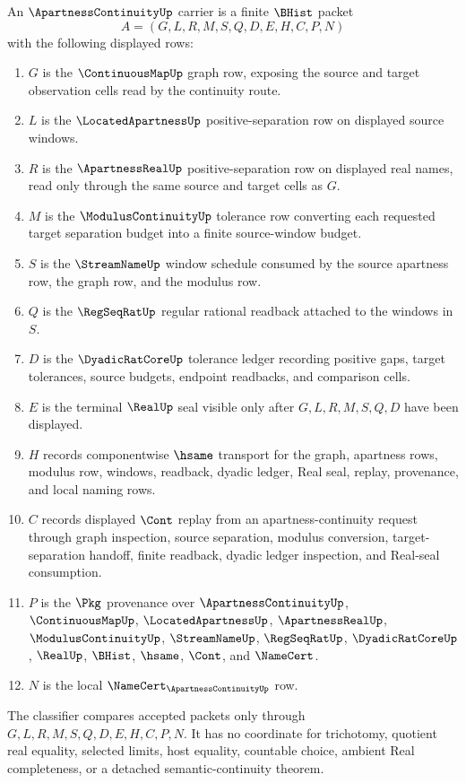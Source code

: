 \begin{definition}
\label{def:apartness-continuity-carrier}
An $\ApartnessContinuityUp$ carrier is a finite $\BHist$ packet
$$
A=(G,L,R,M,S,Q,D,E,H,C,P,N)
$$
with the following displayed rows:
\begin{enumerate}
\item $G$ is the $\ContinuousMapUp$ graph row, exposing the source and target observation cells read by the continuity route.
\item $L$ is the $\LocatedApartnessUp$ positive-separation row on displayed source windows.
\item $R$ is the $\ApartnessRealUp$ positive-separation row on displayed real names, read only through the same source and target cells as $G$.
\item $M$ is the $\ModulusContinuityUp$ tolerance row converting each requested target separation budget into a finite source-window budget.
\item $S$ is the $\StreamNameUp$ window schedule consumed by the source apartness row, the graph row, and the modulus row.
\item $Q$ is the $\RegSeqRatUp$ regular rational readback attached to the windows in $S$.
\item $D$ is the $\DyadicRatCoreUp$ tolerance ledger recording positive gaps, target tolerances, source budgets, endpoint readbacks, and comparison cells.
\item $E$ is the terminal $\RealUp$ seal visible only after $G,L,R,M,S,Q,D$ have been displayed.
\item $H$ records componentwise $\hsame$ transport for the graph, apartness rows, modulus row, windows, readback, dyadic ledger, Real seal, replay, provenance, and local naming rows.
\item $C$ records displayed $\Cont$ replay from an apartness-continuity request through graph inspection, source separation, modulus conversion, target-separation handoff, finite readback, dyadic ledger inspection, and Real-seal consumption.
\item $P$ is the $\Pkg$ provenance over $\ApartnessContinuityUp$, $\ContinuousMapUp$, $\LocatedApartnessUp$, $\ApartnessRealUp$, $\ModulusContinuityUp$, $\StreamNameUp$, $\RegSeqRatUp$, $\DyadicRatCoreUp$, $\RealUp$, $\BHist$, $\hsame$, $\Cont$, and $\NameCert$.
\item $N$ is the local $\NameCert_{\ApartnessContinuityUp}$ row.
\end{enumerate}
The classifier compares accepted packets only through $G,L,R,M,S,Q,D,E,H,C,P,N$. It has no coordinate for trichotomy, quotient real equality, selected limits, host equality, countable choice, ambient Real completeness, or a detached semantic-continuity theorem.
\end{definition}

